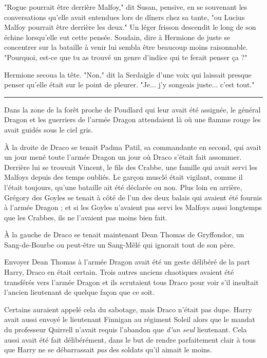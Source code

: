 "Rogue pourrait être derrière Malfoy," dit Susan, pensive, en se souvenant les conversations qu'elle avait entendues lors de dîners chez sa tante, "ou Lucius Malfoy pourrait être derrière les deux." Un léger frisson descendit le long de son échine lorsqu'elle eut cette pensée. Soudain, dire à Hermione de juste se concentrer sur la bataille à venir lui sembla être beaucoup moins raisonnable. "Pourquoi, est-ce que tu as trouvé un genre d'indice qui te ferait penser ça ?"

Hermione secoua la tête. "Non," dit la Serdaigle d'une voix qui laissait presque penser qu'elle était sur le point de pleurer. "Je... j'y songeais juste... c'est tout."
\par\noindent\rule{\textwidth}{0.4pt}
Dans la zone de la forêt proche de Poudlard qui leur avait été assignée, le général Dragon et les guerriers de l'armée Dragon attendaient là où une flamme rouge les avait guidés sous le ciel gris.

À la droite de Draco se tenait Padma Patil, sa commandante en second, qui avait un jour mené toute l'armée Dragon un jour où Draco s'était fait assommer. Derrière lui se trouvait Vincent, le fils des Crabbe, une famille qui avait servi les Malfoys depuis des temps oubliés. Le garçon musclé était vigilant, comme il l'était toujours, qu'une bataille ait été déclarée ou non. Plus loin en arrière, Grégory des Goyles se tenait à côté de l'un des deux balais qui avaient été fournis à l'armée Dragon ; et si les Goyles n'avaient pas servi les Malfoys aussi longtemps que les Crabbes, ils ne l'avaient pas moins bien fait.

À la gauche de Draco se tenait maintenant Dean Thomas de Gryffondor, un Sang-de-Bourbe ou peut-être un Sang-Mêlé qui ignorait tout de son père.

Envoyer Dean Thomas à l'armée Dragon avait été un geste délibéré de la part Harry, Draco en était certain. Trois autres anciens chaotiques avaient été transférés vers l'armée Dragon et ils scrutaient tous Draco pour voir s'il insultait l'ancien lieutenant de quelque façon que ce soit.

Certains auraient appelé cela du sabotage, mais Draco n'était pas dupe. Harry avait aussi envoyé le lieutenant Finnigan au régiment Soleil alors que le mandat du professeur Quirrell n'avait requis l'abandon que \emph{d'un seul}  lieutenant. Cela aussi avait été fait délibérément, dans le but de rendre parfaitement clair à tous que Harry ne se débarrassait \emph{pas}  des soldats qu'il aimait le moins.

